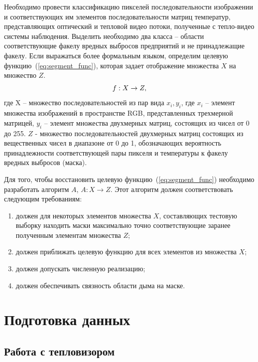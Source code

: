 \documentclass[14pt, a4paper]{extreport}
\begin{document}
	Необходимо провести классификацию пикселей последовательности изображении и соответствующих им элементов последовательности матриц температур, представляющих оптический и тепловой видео потоки, полученные с тепло-видео системы наблюдения. Выделить необходимо два класса -- области соответствующие факелу вредных выбросов предприятий и не принадлежащие факелу. Если выражаться более формальным языком, определим целевую функцию~(\ref{eq:segment_func}), которая задает отображение множества $X$ на множество $Z$.
	\vspace*{-0.2cm}
	\begin{equation}
		f: X \rightarrow Z,
		\label{eq:segment_func}
		\vspace*{-0.4cm}
	\end{equation}
	где X -- множество последовательностей из пар вида $x_i, y_i$, где $x_i$ -- элемент множества изображений в пространстве RGB, представленных трехмерной матрицей, $y_i$ -- элемент множества двухмерных матриц, состоящих из чисел от 0 до 255. $Z$ - множество последовательностей двухмерных матриц состоящих из вещественных чисел в диапазоне от 0 до 1, обозначающих вероятность принадлежности соответствующей пары пикселя и температуры к факелу вредных выбросов (маска).
	
	Для того, чтобы восстановить целевую функцию~(\ref{eq:segment_func}) необходимо разработать алгоритм $A$, $A: X \rightarrow Z$. Этот алгоритм должен соответствовать следующим требованиям:
	\begin{enumerate}[label={\arabic*)}]
		\item должен для некоторых элементов множества $X$, составляющих тестовую выборку находить маски максимально точно соответствующие заранее полученным элементам множества $Z$;
		\item должен приближать целевую функцию для всех элементов из множества $X$;
		\item должен допускать численную реализацию;
		\item должен обеспечивать связность области дыма на маске.
	\end{enumerate}
	
	\section{Подготовка данных}
	\subsection{Работа с тепловизором}
	
\end{document}
